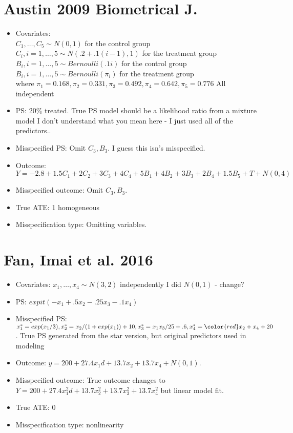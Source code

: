 \documentclass{article}
\begin{document}
\section{Austin 2009 Biometrical J. \cite{Austin2009}}
\begin{itemize}
\item Covariates:\\
$C_1, \ldots, C_5 \sim N(0, 1)$ for the control group\\
$C_i, i=1,\ldots,5 \sim N(.2+.1(i-1), 1)$ for the treatment group\\
$B_i, i=1,\ldots,5 \sim Bernoulli(.1i)$ for the control group\\
$B_i, i=1,\ldots,5 \sim Bernoulli(\pi_i)$ for the treatment group\\
where $\pi_1 = 0.168, \pi_2 = 0.331, \pi_3 = 0.492, \pi_4 = 0.642, \pi_5 = 0.776$
All independent
\item PS:  20\% treated. True PS model should be a likelihood ratio from a mixture model {\color{red} I don't understand what you mean here - I just used all of the predictors.}.
\item Misspecified PS: Omit $C_3, B_3$. {\color{red}  I guess this isn's misspecified.}
\item Outcome: $Y=-2.8 +  1.5C_1 + 2C_2 +3C_3 +4C_4 +5B_1 +4B_2 + 3B_3 + 2B_4 +1.5B_5 + T + N(0, 4)$
\item Misspecified outcome: Omit $C_3, B_3$.
\item True ATE: 1 homogeneous 
\item Misspecification type: Omitting variables.
\end{itemize}

\section{Fan, Imai et al. 2016 \cite{Fan2016}}
\begin{itemize}
\item Covariates: $x_1, \ldots, x_4 \sim N(3, 2)$ independently {\color{red} I did $N(0, 1)$ - change?}
\item PS: $expit(- x_1 +.5x_2 -.25x_3 -.1x_4)$ 
\item Misspecified PS:  $x_1^* = exp(x_1/3), x_2^*=x_2/(1+exp(x_1))+10, x_3^*=x_1x_3/25 + .6, x_4^* = {\color{red} x_2} +x_4 + 20$.  True PS generated from the star version, but original predictors used in modeling
\item Outcome: $y = 200 + 27.4 x_1d + 13.7 x_2 + 13.7x_4 + N(0,1)$.
\item Misspecified outcome: True outcome changes to 
$Y = 200 + 27.4x_1^2d + 13.7x_2^2 + 13.7x_3^2+ 13.7x_4^2$ but linear model fit.
\item True ATE: 0
\item Misspecification type:  nonlinearity
\end{itemize}
\end{document}
